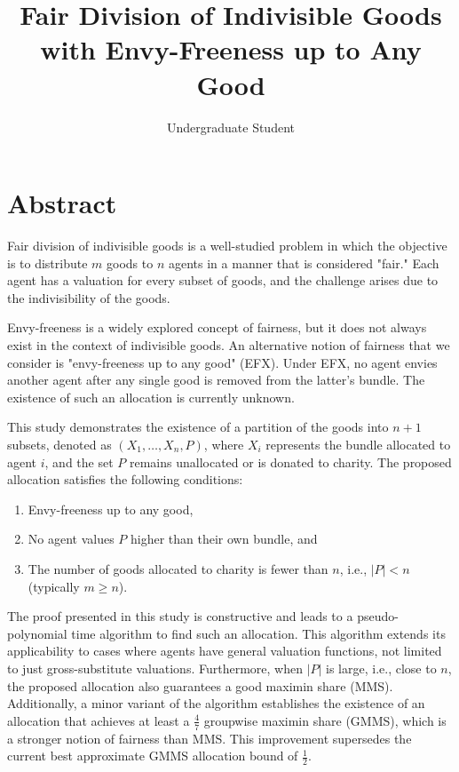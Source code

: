 \documentclass{article}
\begin{document}
\title{Fair Division of Indivisible Goods with Envy-Freeness up to Any Good}
\author{Undergraduate Student}
\date{}

\maketitle

\section*{Abstract}

Fair division of indivisible goods is a well-studied problem in which the objective is to distribute $m$ goods to $n$ agents in a manner that is considered "fair." Each agent has a valuation for every subset of goods, and the challenge arises due to the indivisibility of the goods.

Envy-freeness is a widely explored concept of fairness, but it does not always exist in the context of indivisible goods. An alternative notion of fairness that we consider is "envy-freeness up to any good" (EFX). Under EFX, no agent envies another agent after any single good is removed from the latter's bundle. The existence of such an allocation is currently unknown.

This study demonstrates the existence of a partition of the goods into $n+1$ subsets, denoted as $(X_1, \ldots, X_n, P)$, where $X_i$ represents the bundle allocated to agent $i$, and the set $P$ remains unallocated or is donated to charity. The proposed allocation satisfies the following conditions:

\begin{enumerate}
    \item Envy-freeness up to any good,
    \item No agent values $P$ higher than their own bundle, and
    \item The number of goods allocated to charity is fewer than $n$, i.e., $|P| < n$ (typically $m \geq n$).
\end{enumerate}

The proof presented in this study is constructive and leads to a pseudo-polynomial time algorithm to find such an allocation. This algorithm extends its applicability to cases where agents have general valuation functions, not limited to just gross-substitute valuations. Furthermore, when $|P|$ is large, i.e., close to $n$, the proposed allocation also guarantees a good maximin share (MMS). Additionally, a minor variant of the algorithm establishes the existence of an allocation that achieves at least a $\frac{4}{7}$ groupwise maximin share (GMMS), which is a stronger notion of fairness than MMS. This improvement supersedes the current best approximate GMMS allocation bound of $\frac{1}{2}$.
\end{document}

